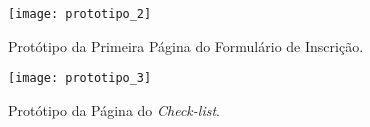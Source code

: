 \begin{itemize}
{\begin{figure}[H]
		\label{fig:protipoum}
	\end{figure}
	\begin{figure}[H]
		\centering
		\texttt{[image: prototipo\_2]}
		\caption[Protótipo da Primeira Página do Formulário de Inscrição]{Protótipo da Primeira Página do Formulário de Inscrição.}
		\label{fig:protipodois}
	\end{figure}
	\begin{figure}[H]
		\centering
		\texttt{[image: prototipo\_3]}
		\caption[Protótipo da Página do \emph{Check-list}]{Protótipo da Página do \emph{Check-list}.}
		\label{fig:protipotres}
	\end{figure}}
\end{itemize}